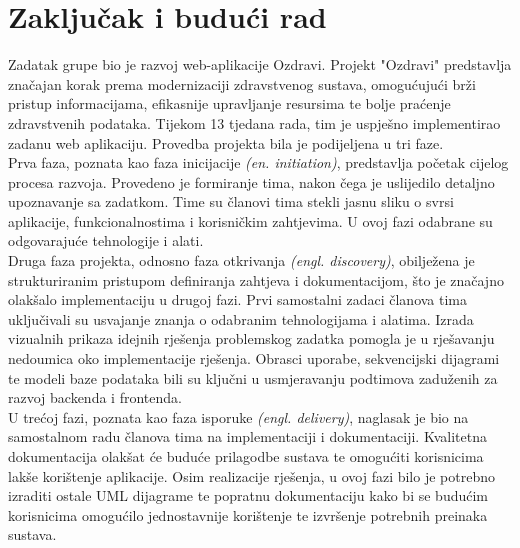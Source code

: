 \chapter{Zaključak i budući rad}
		
		
		

		 Zadatak grupe bio je razvoj web-aplikacije Ozdravi. Projekt "Ozdravi" predstavlja značajan korak prema modernizaciji zdravstvenog sustava, omogućujući brži pristup informacijama, efikasnije upravljanje resursima te bolje praćenje zdravstvenih podataka. Tijekom 13 tjedana rada, tim je uspješno implementirao zadanu web aplikaciju. Provedba projekta bila je podijeljena u tri faze. \\
		 Prva faza, poznata kao faza inicijacije \textit{(en. initiation)}, predstavlja početak cijelog procesa razvoja. Provedeno je formiranje tima, nakon čega je uslijedilo detaljno upoznavanje sa zadatkom. Time su članovi tima stekli jasnu sliku o svrsi aplikacije, funkcionalnostima i korisničkim zahtjevima. U ovoj fazi odabrane su odgovarajuće tehnologije i alati.   \\
		 Druga faza projekta, odnosno faza otkrivanja \textit{(engl. discovery)}, obilježena je strukturiranim pristupom definiranja zahtjeva i dokumentacijom, što je značajno olakšalo implementaciju u drugoj fazi. Prvi samostalni zadaci članova tima uključivali su usvajanje znanja o odabranim tehnologijama i alatima. Izrada vizualnih prikaza idejnih rješenja problemskog zadatka pomogla je u rješavanju nedoumica oko implementacije rješenja. Obrasci uporabe, sekvencijski dijagrami te modeli baze podataka bili su ključni u usmjeravanju podtimova zaduženih za razvoj backenda i frontenda. \\
		 U trećoj fazi, poznata kao faza isporuke \textit{(engl. delivery)}, naglasak je bio na samostalnom radu članova tima na implementaciji i dokumentaciji. Kvalitetna dokumentacija olakšat će buduće prilagodbe sustava te omogućiti korisnicima lakše korištenje aplikacije. Osim realizacije rješenja, u ovoj fazi bilo je potrebno izraditi ostale UML dijagrame te popratnu dokumentaciju kako bi se budućim korisnicima omogućilo jednostavnije korištenje te izvršenje potrebnih preinaka sustava. 
